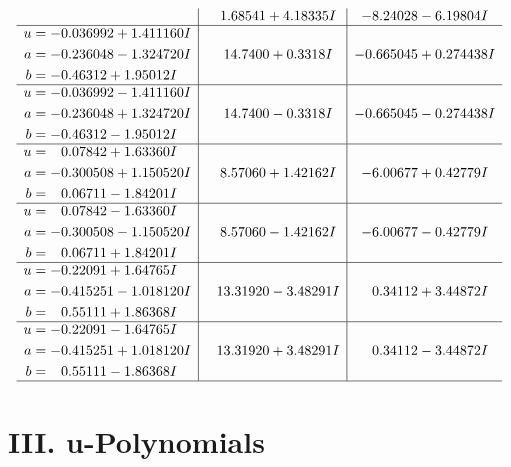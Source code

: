 \documentclass[1p]{elsarticle_modified}
\theoremstyle{definition}
\begin{document}
$$\begin{array}{c|c|c}
 & \phantom{-}1.68541 + 4.18335 I & -8.24028 - 6.19804 I \\ \hline\begin{aligned}
u &= -0.036992 + 1.411160 I \\
a &= -0.236048 - 1.324720 I \\
b &= -0.46312 + 1.95012 I\end{aligned}
 & \phantom{-}14.7400 + 0.3318 I & -0.665045 + 0.274438 I \\ \hline\begin{aligned}
u &= -0.036992 - 1.411160 I \\
a &= -0.236048 + 1.324720 I \\
b &= -0.46312 - 1.95012 I\end{aligned}
 & \phantom{-}14.7400 - 0.3318 I & -0.665045 - 0.274438 I \\ \hline\begin{aligned}
u &= \phantom{-}0.07842 + 1.63360 I \\
a &= -0.300508 + 1.150520 I \\
b &= \phantom{-}0.06711 - 1.84201 I\end{aligned}
 & \phantom{-}8.57060 + 1.42162 I & -6.00677 + 0.42779 I \\ \hline\begin{aligned}
u &= \phantom{-}0.07842 - 1.63360 I \\
a &= -0.300508 - 1.150520 I \\
b &= \phantom{-}0.06711 + 1.84201 I\end{aligned}
 & \phantom{-}8.57060 - 1.42162 I & -6.00677 - 0.42779 I \\ \hline\begin{aligned}
u &= -0.22091 + 1.64765 I \\
a &= -0.415251 - 1.018120 I \\
b &= \phantom{-}0.55111 + 1.86368 I\end{aligned}
 & \phantom{-}13.31920 - 3.48291 I & \phantom{-}0.34112 + 3.44872 I \\ \hline\begin{aligned}
u &= -0.22091 - 1.64765 I \\
a &= -0.415251 + 1.018120 I \\
b &= \phantom{-}0.55111 - 1.86368 I\end{aligned}
 & \phantom{-}13.31920 + 3.48291 I & \phantom{-}0.34112 - 3.44872 I\\
 \hline 
 \end{array}$$\newpage
\newpage\renewcommand{\arraystretch}{1}
\centering \section*{ III. u-Polynomials}
\end{document}
